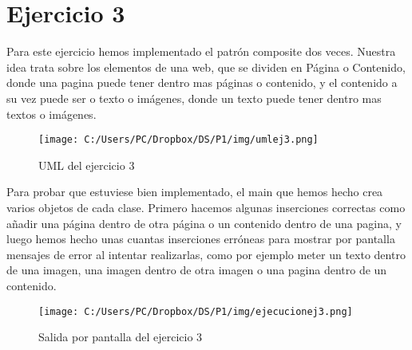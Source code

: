 \documentclass{article}
\begin{document}
\section{Ejercicio 3}
Para este ejercicio hemos implementado el patrón composite dos veces. Nuestra idea trata sobre los elementos de una web, que se dividen en Página o Contenido, donde una pagina puede tener dentro mas páginas o contenido, y el contenido a su vez puede ser o texto o imágenes, donde un texto puede tener dentro mas textos o imágenes. 
\begin{figure}[H]
\centering
\texttt{[image: C:/Users/PC/Dropbox/DS/P1/img/umlej3.png]}
\caption{UML del ejercicio 3}
\end{figure}
Para probar que estuviese bien implementado, el main que hemos hecho crea varios objetos de cada clase. Primero hacemos algunas inserciones correctas como añadir una página dentro de otra página o un contenido dentro de una pagina, y luego hemos hecho unas cuantas inserciones erróneas para mostrar por pantalla mensajes de error al intentar realizarlas, como por ejemplo meter un texto dentro de una imagen, una imagen dentro de otra imagen o una pagina dentro de un contenido.
\begin{figure}[H]
\centering
\texttt{[image: C:/Users/PC/Dropbox/DS/P1/img/ejecucionej3.png]}
\caption{Salida por pantalla del ejercicio 3}
\end{figure}
\end{document}
